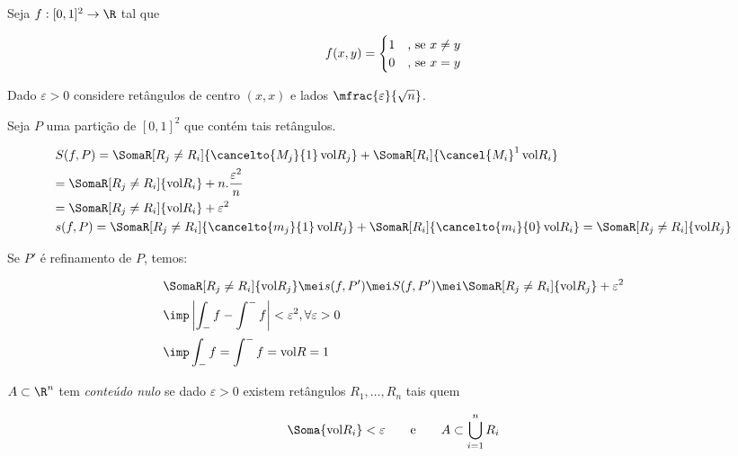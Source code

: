 \documentclass[11pt, oneside, a4paper]{gsm-l}
\begin{document}
\begin{exem}
Seja $f:[0,1]^2 \to \R$ tal que

\begin{equation*}
  f(x,y) =
  \begin{cases}
    \hfill 1 	& \mbox{, se } x \ne y \\
    \hfill 0 	& \mbox{, se } x = y
  \end{cases}
\end{equation*}
\end{exem}

\begin{sol}
Dado $\varepsilon > 0$ considere ret\^angulos de centro $(x,x)$ e lados $\mfrac{\varepsilon}{\sqrt n}$.

Seja $P$ uma partição de $[0,1]^2$ que contém tais ret\^angulos.

\[
\begin{gathered}
  S(f,P) = \SomaR[R_j \ne R_i]{\mathop {\cancelto{M_j}{1}} \text{vol}R_j} + \SomaR[R_i]{\mathop {\cancel{M_i}}\nolimits^1 \text{vol}R_i} \hfill \\
   = \SomaR[R_j \ne R_i]{\text{vol}R_i} + n.\frac{{\varepsilon ^2 }}
{n} \hfill \\
   = \SomaR[R_j \ne R_i]{\text{vol}R_i} + \varepsilon ^2  \hfill \\
  s(f,P) = \SomaR[R_j \ne R_i]{\mathop {\cancelto{m_j}{1}} \text{vol}R_j} + \SomaR[R_i]{\mathop {\cancelto{m_i}{0}} \text{vol}R_i} = \SomaR[R_j \ne R_i]{\text{vol}R_j} \hfill \\ 
\end{gathered} 
\]

Se $P'$ é refinamento de $P$, temos:

\[
\begin{gathered}
  \SomaR[R_j \ne R_i]{\text{vol}R_j} \mei s(f,P') \mei S(f,P') \mei \SomaR[R_j \ne R_i]{\text{vol}R_j} + \varepsilon^2 \hfill \\
  \imp \left| {\int_{-} f - \int^{-} f} \right| < \varepsilon^2 ,\forall \varepsilon > 0 \hfill \\
  \imp \int_{-} f = \int^{-} f = \text{vol}R = 1 \hfill \\ 
\end{gathered} 
\]

\end{sol}

\begin{defi}
$A \subset \R^n$ tem \textit{conte\'udo nulo} se dado $\varepsilon > 0$ existem ret\^angulos $R_1,\ldots,R_n$ tais quem

\[
\Soma{\text{vol}R_i} < \varepsilon \qquad \text{e} \qquad A \subset \bigcup\limits_{i=1}^n {R_i}
\]
\end{defi}
\end{document}
